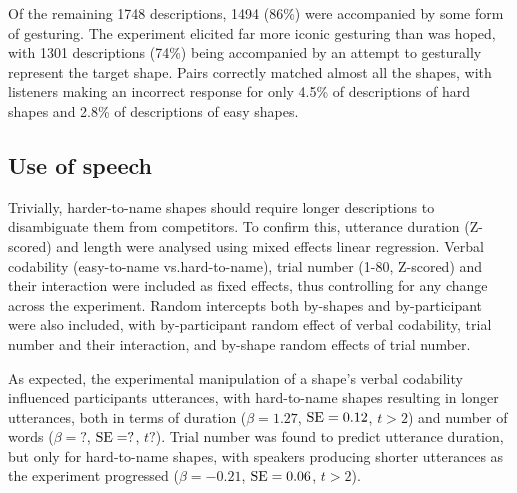 \documentclass[a4paper,man,natbib]{apa6}
\newcommand{\resultsLM}[3]{$\beta = #1$, $\textnormal{SE} = #2$, $t #3$}
\begin{document}
Of the remaining 1748 descriptions, 1494 (86\%) were accompanied by some form of gesturing. 
The experiment elicited far more iconic gesturing than was hoped, with 1301 descriptions (74\%) being accompanied by an attempt to gesturally represent the target shape.
Pairs correctly matched almost all the shapes, with listeners making an incorrect response for only 4.5\% of descriptions of hard shapes and 2.8\% of descriptions of easy shapes.

\subsection{Use of speech}
Trivially, harder-to-name shapes should require longer descriptions to disambiguate them from competitors. 
To confirm this, utterance duration (Z-scored) and length were analysed using mixed effects linear regression.
Verbal codability (easy-to-name vs.\@ hard-to-name), trial number (1-80, Z-scored) and their interaction were included as fixed effects, thus controlling for any change across the experiment.
Random intercepts both by-shapes and by-participant were also included, with by-participant random effect of verbal codability, trial number and their interaction, and by-shape random effects of trial number.

As expected, the experimental manipulation of a shape's verbal codability influenced participants utterances, with hard-to-name shapes resulting in longer utterances, both in terms of duration (\resultsLM{1.27}{0.12}{>2}) and number of words (\resultsLM{?}{?}{?}).
Trial number was found to predict utterance duration, but only for hard-to-name shapes, with speakers producing shorter utterances as the experiment progressed (\resultsLM{-0.21}{0.06}{>2}).
\end{document}
